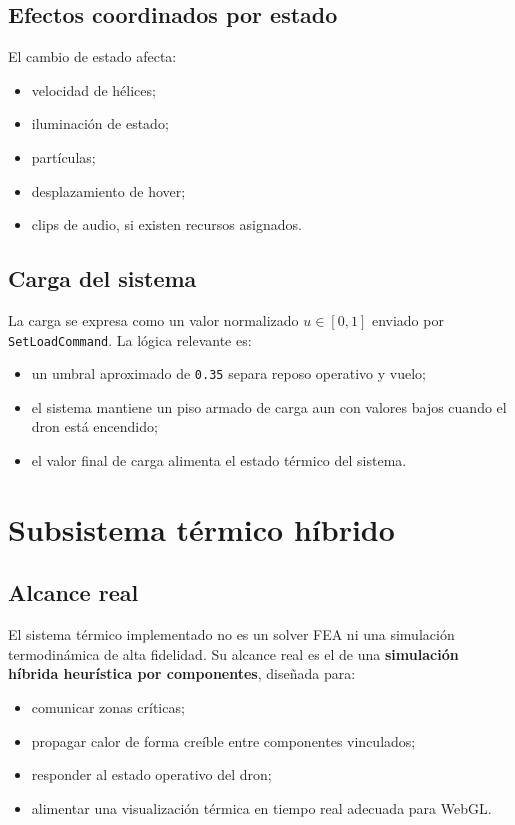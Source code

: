 \documentclass[12pt,letterpaper]{article}
\begin{document}
\subsection{Efectos coordinados por estado}
El cambio de estado afecta:
\begin{itemize}
    \item velocidad de hélices;
    \item iluminación de estado;
    \item partículas;
    \item desplazamiento de hover;
    \item clips de audio, si existen recursos asignados.
\end{itemize}

\subsection{Carga del sistema}
La carga se expresa como un valor normalizado $u \in [0,1]$ enviado por \texttt{SetLoadCommand}. La lógica relevante es:
\begin{itemize}
    \item un umbral aproximado de \texttt{0.35} separa reposo operativo y vuelo;
    \item el sistema mantiene un piso armado de carga aun con valores bajos cuando el dron está encendido;
    \item el valor final de carga alimenta el estado térmico del sistema.
\end{itemize}

\section{Subsistema térmico híbrido}

\subsection{Alcance real}
El sistema térmico implementado no es un solver FEA ni una simulación termodinámica de alta fidelidad. Su alcance real es el de una \textbf{simulación híbrida heurística por componentes}, diseñada para:
\begin{itemize}
    \item comunicar zonas críticas;
    \item propagar calor de forma creíble entre componentes vinculados;
    \item responder al estado operativo del dron;
    \item alimentar una visualización térmica en tiempo real adecuada para WebGL.
\end{itemize}
\end{document}
